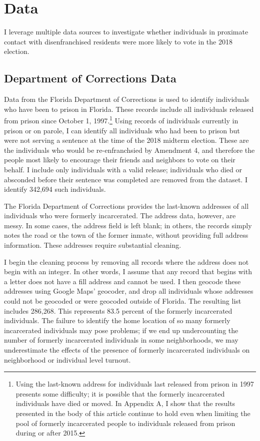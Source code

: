 \documentclass[
  12pt,
]{article}
\begin{document}
\hypertarget{data}{%
\section*{Data}\label{data}}

I leverage multiple data sources to investigate whether individuals in proximate contact with disenfranchised residents were more likely to vote in the 2018 election.

\hypertarget{department-of-corrections-data}{%
\subsection*{Department of Corrections Data}\label{department-of-corrections-data}}

Data from the Florida Department of Corrections is used to identify individuals who have been to prison in Florida. These records include all individuals released from prison since October 1, 1997.\footnote{Using the last-known address for individuals last released from prison in 1997 presents some difficulty; it is possible that the formerly incarcerated individuals have died or moved. In Appendix A, I show that the results presented in the body of this article continue to hold even when limiting the pool of formerly incarcerated people to individuals released from prison during or after 2015.} Using records of individuals currently in prison or on parole, I can identify all individuals who had been to prison but were not serving a sentence at the time of the 2018 midterm election. These are the individuals who would be re-enfranchsied by Amendment 4, and therefore the people most likely to encourage their friends and neighbors to vote on their behalf. I include only individuals with a valid release; individuals who died or absconded before their sentence was completed are removed from the dataset. I identify 342,694 such individuals.

The Florida Department of Corrections provides the last-known addresses of all individuals who were formerly incarcerated. The address data, however, are messy. In some cases, the address field is left blank; in others, the records simply notes the road or the town of the former inmate, without providing full address information. These addresses require substantial cleaning.

I begin the cleaning process by removing all records where the address does not begin with an integer. In other words, I assume that any record that begins with a letter does not have a fill address and cannot be used. I then geocode these addresses using Google Maps' geocoder, and drop all individuals whose addresses could not be geocoded or were geocoded outside of Florida. The resulting list includes 286,268. This represents 83.5 percent of the formerly incarcerated individuals. The failure to identify the home location of so many formerly incarcerated individuals may pose problems; if we end up undercounting the number of formerly incarcerated individuals in some neighborhoods, we may underestimate the effects of the presence of formerly incarcerated individuals on neighborhood or individual level turnout.
\end{document}
